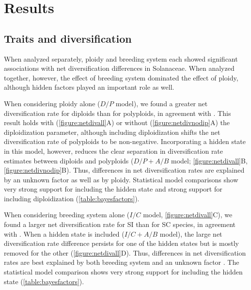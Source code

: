 \section{Results}

\subsection{Traits and diversification}

When analyzed separately, ploidy and breeding system each showed significant associations with net diversification differences in Solanaceae.
When analyzed together, however, the effect of breeding system dominated the effect of ploidy, although hidden factors played an important role as well.

When considering ploidy alone ($D/P$ model), we found a greater net diversification rate for diploids than for polyploids, in agreement with \citet{mayrose_2011, mayrose_2015}.
This result holds with (\cref{figure:netdivall}A) or without (\cref{figure:netdivnodip}A) the diploidization parameter, although including diploidization shifts the net diversification rate of polyploids to be non-negative.
Incorporating a hidden state in this model, however, reduces the clear separation in diversification rate estimates between diploids and polyploids ($D/P+A/B$ model; \cref{figure:netdivall}B, \cref{figure:netdivnodip}B).
Thus, differences in net diversification rates are explained by an unknown factor as well as by ploidy.
Statistical model comparisons show very strong support for including the hidden state and strong support for including diploidization (\cref{table:bayesfactors}).

When considering breeding system alone ($I/C$ model, \cref{figure:netdivall}C), we found a larger net diversification rate for SI than for SC species, in agreement with \citet{goldberg_2010}.
When a hidden state is included ($I/C+A/B$ model), the large net diversification rate difference persists for one of the hidden states but is mostly removed for the other (\cref{figure:netdivall}D).
Thus, differences in net diversification rates are best explained by both breeding system and an unknown factor \citep[as in Onagraceae;][]{freyman_2019}.
The statistical model comparison shows very strong support for including the hidden state (\cref{table:bayesfactors}).

